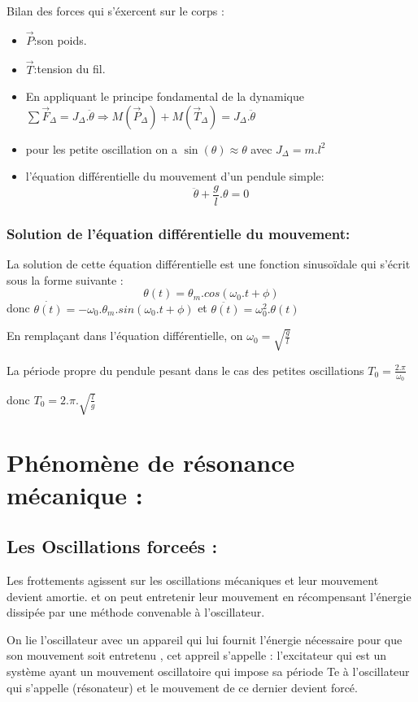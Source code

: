 \documentclass[12pt]{article}
\begin{document}
Bilan des forces qui s'éxercent sur le corps :
\begin{itemize}
	\item $\vec{P}$:son poids.
	\item $\vec{T}$:tension du fil.
	\item En appliquant le principe fondamental de la dynamique  $\sum{\vec{F}_{\Delta}} = J_{\Delta}.\ddot{\theta} \Rightarrow M(\vec{P}_{\Delta}) + M(\vec{T}_{\Delta}) = J_{\Delta}.\ddot{\theta}$

	\item pour les petite oscillation on a $\sin(\theta) \approx \theta$ avec $J_{\Delta} = m.l^2$
	\item l'équation différentielle du mouvement d'un pendule simple: $$\ddot{\theta} + \frac{g}{l}.\theta = 0$$ 

\end{itemize}

\subsubsection{Solution de l'équation différentielle du mouvement: }
La solution de cette équation différentielle est une fonction sinusoïdale qui s'écrit sous la forme suivante : $$\theta(t) = \theta_m.cos(\omega_0.t + \phi)$$
donc $\dot{ \theta(t) }= -\omega_0.\theta_m.sin(\omega_0.t + \phi)$ et $\ddot{\theta(t)} = \omega_0^2.\theta(t)$

En remplaçant dans l'équation différentielle, on $\omega_0 = \sqrt{\frac{g}{l}}$

La période propre du pendule pesant dans le cas des petites oscillations $T_0 = \frac{2.\pi}{\omega_0}$

donc $T_0 = 2.\pi.\sqrt{\frac{l}{g}}$

\section{Phénomène de résonance mécanique :  }
\subsection{Les Oscillations forceés :}
Les frottements agissent sur les oscillations mécaniques et leur mouvement devient amortie. et on peut entretenir leur
mouvement en récompensant l'énergie dissipée par une méthode convenable à l'oscillateur.

On lie l'oscillateur avec un appareil qui lui fournit l'énergie nécessaire pour que son mouvement soit entretenu , cet appreil
s'appelle : l'excitateur qui est un système ayant un mouvement oscillatoire qui impose sa période Te à l'oscillateur qui s’appelle
(résonateur) et le mouvement de ce dernier devient forcé.
\end{document}
